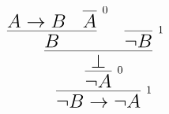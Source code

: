 \documentclass[14pt,border=2pt]{standalone}
\begin{document}
        $$
        \LARGE 

\begin{prooftree}
\hypo{A \to B}
\infer0[\normalsize 0]{A}
\infer2{B}
\infer0[\normalsize 1]{\neg B}
\infer2{\bot}
\infer1[\normalsize 0]{\neg A}
\infer1[\normalsize 1]{\neg B \to \neg A}
\end{prooftree}
        $$
        
\end{document}
